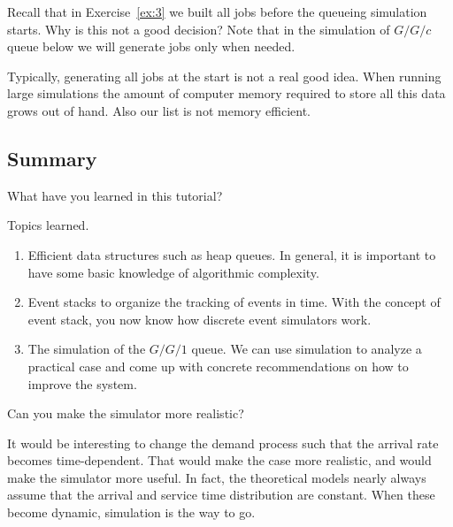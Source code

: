 \begin{exercise}
  Recall that in Exercise~\ref{ex:3} we built all jobs before the queueing simulation starts. Why is this not a good decision? Note that in the simulation of $G/G/c$ queue below we will generate jobs only when needed.
\begin{solution}
    Typically, generating all jobs at the start is not a real good idea. When running large simulations the amount of computer memory required to store all this data grows out of hand. Also our  list is not memory efficient.
  \end{solution}
\end{exercise}


\subsection{Summary }
\label{sec:summary-}

\begin{exercise}
  What have you learned in this tutorial?
\begin{solution}
    Topics learned.
    \begin{enumerate}
    \item Efficient data structures such as heap queues. In general, it is important to have some basic knowledge of algorithmic complexity.
    \item Event stacks to organize the tracking of events in time. With the concept of event stack, you now know how discrete event simulators work.
    \item The simulation of the $G/G/1$ queue.
      We  can use simulation to analyze a practical case and come up with concrete recommendations on how to improve the system.
    \end{enumerate}
  \end{solution}
\end{exercise}


\begin{exercise}
Can you make the simulator more realistic?
\begin{solution}
  It would be interesting to change the demand process such that the arrival rate becomes time-dependent.
  That would make the case more realistic, and would make the simulator more useful.
  In fact, the theoretical models nearly always assume that the arrival and service time distribution are constant.
  When these become dynamic, simulation is the way to go.
\end{solution}
\end{exercise}

